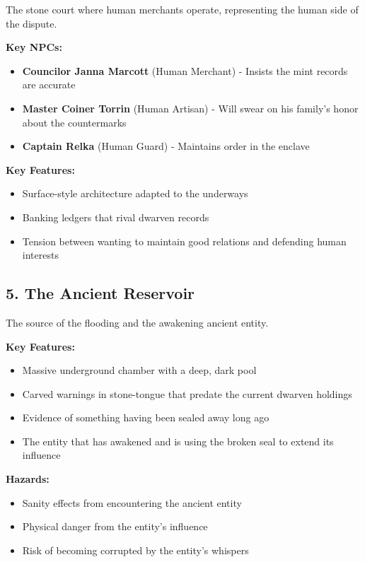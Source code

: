 \documentclass[11pt]{article}
\begin{document}
The stone court where human merchants operate, representing the human side of the dispute.

\textbf{Key NPCs:}
\begin{itemize}
\item \textbf{Councilor Janna Marcott} (Human Merchant) - Insists the mint records are accurate
\item \textbf{Master Coiner Torrin} (Human Artisan) - Will swear on his family's honor about the countermarks
\item \textbf{Captain Relka} (Human Guard) - Maintains order in the enclave
\end{itemize}

\textbf{Key Features:}
\begin{itemize}
\item Surface-style architecture adapted to the underways
\item Banking ledgers that rival dwarven records
\item Tension between wanting to maintain good relations and defending human interests
\end{itemize}

\subsection{5. The Ancient Reservoir}

The source of the flooding and the awakening ancient entity.

\textbf{Key Features:}
\begin{itemize}
\item Massive underground chamber with a deep, dark pool
\item Carved warnings in stone-tongue that predate the current dwarven holdings
\item Evidence of something having been sealed away long ago
\item The entity that has awakened and is using the broken seal to extend its influence
\end{itemize}

\textbf{Hazards:}
\begin{itemize}
\item Sanity effects from encountering the ancient entity
\item Physical danger from the entity's influence
\item Risk of becoming corrupted by the entity's whispers
\end{itemize}
\end{document}

